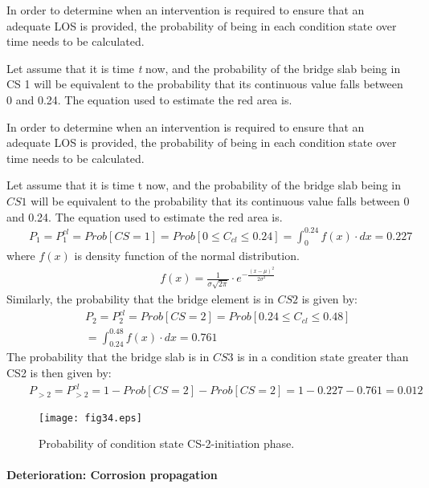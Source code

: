 In order to determine when an intervention is required to ensure that an adequate LOS is provided, the probability of being in each condition state over time needs to be calculated.

Let assume that it is time \textit{t} now, and the probability of the bridge slab being in CS 1 will be equivalent to the probability that its continuous value falls between 0 and 0.24. The equation used to estimate the red area is.

In order to determine when an intervention is required to ensure that an adequate LOS is provided, the probability of being in each condition state over time needs to be calculated. 

Let assume that it is time t now, and the probability of the bridge slab being in $CS1$ will be equivalent to the probability that its continuous value falls between 0 and 0.24. The equation used to estimate the red area is.
\begin{eqnarray}
      && P_1 =P_1^{cl} = Prob[CS=1]=Prob[0 \leq C_{cl} \leq 0.24] = \int_0^{0.24}f(x) \cdot dx = 0.227 \label{stateprobcs1}
\end{eqnarray}
where $f(x)$ is density function of the normal distribution. 
\begin{eqnarray}
      && f(x)= \frac{1}{\sigma \sqrt{2\pi}}\cdot e^{-\frac{(x-\mu)^2}{2\sigma^2}}\label{densitynormaldistribu}
\end{eqnarray}
Similarly, the probability that the bridge element is in $CS2$ is given by:
\begin{eqnarray}
      && P_2 = P_2^{cl} = Prob[CS=2]=Prob[0.24 \leq C_{cl} \leq 0.48] \nonumber \\
      && = \int_{0.24}^{0.48}f(x) \cdot dx = 0.761 \label{stateprobcs2}
\end{eqnarray}
The probability that the bridge slab is in $CS3$ is in a condition state greater than CS2 is then given by:
\begin{eqnarray}
      && P_{>2} = P_{>2}^{cl} = 1-Prob[CS=2]-Prob[CS=2]=1-0.227-0.761=0.012\label{stateprobcs345}
\end{eqnarray}
%
\begin{figure}[h!]
\texttt{[image: fig34.eps]} 
\caption{Probability of condition state CS-2-initiation phase.} 
\label{fig:34}
\end{figure}
%
\paragraph{Deterioration: Corrosion propagation}

